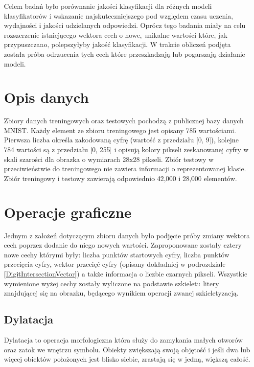 \documentclass{article}
\begin{document}
Celem badań było porównanie jakości klasyfikacji dla różnych modeli klasyfikatorów i wskazanie najskuteczniejszego pod względem czasu uczenia, wydajności i jakości udzielanych odpowiedzi. Oprócz tego badania miały na celu rozszerzenie istniejącego wektora cech o nowe, unikalne wartości które, jak przypuszczano, polepszyłyby jakość klasyfikacji. W trakcie obliczeń podjęta została próba odrzucenia tych cech które przeszkadzają lub pogarszają działanie modeli. \\


\section{Opis danych}

Zbiory danych treningowych oraz testowych pochodzą z publicznej bazy danych MNIST\cite{mnist_database}. Każdy element ze zbioru treningowego jest opisany 785 wartościami. Pierwsza liczba określa zakodowaną cyfrę (wartość z przedziału [0, 9]), kolejne 784 wartości są z przedziału [0, 255] i opisują kolory pikseli zeskanowanej cyfry w skali szarości dla obrazka o wymiarach 28x28 pikseli. Zbiór testowy w przeciwieństwie do treningowego nie zawiera informacji o reprezentowanej klasie. Zbiór treningowy i testowy zawierają odpowiednio 42,000 i 28,000 elementów. \\

\section{Operacje graficzne}
\label{features_vector}
Jednym z założeń dotyczącym zbioru danych było podjęcie próby zmiany wektora cech poprzez dodanie do niego nowych wartości. Zaproponowane zostały cztery nowe cechy którymi były: liczba punktów startowych cyfry, liczba punktów przecięcia cyfry, wektor przecięć cyfry (opisany dokładniej w podrozdziale \ref{DigitIntersectionVector}) a także informacja o liczbie czarnych pikseli. Wszystkie wymienione wyżej cechy zostały wyliczone na podstawie szkieletu litery znajdującej się na obrazku, będącego wynikiem operacji zwanej szkieletyzacją. 

\subsection{Dylatacja}
Dylatacja to operacja morfologiczna która służy do zamykania małych otworów oraz zatok we wnętrzu symbolu. Obiekty zwiększają swoją objętość i jeśli dwa lub więcej obiektów położonych jest blisko siebie, zrastają się w jedną, większą całość.
\end{document}
